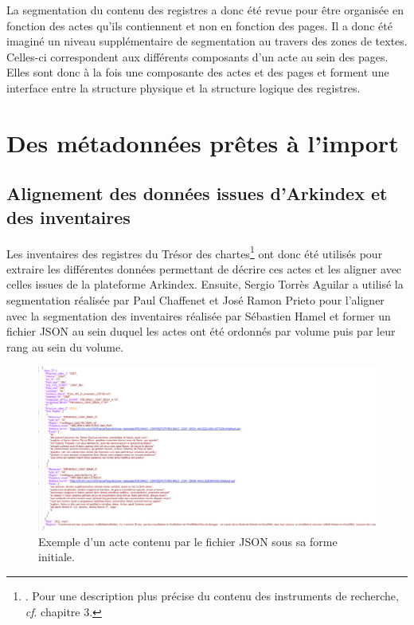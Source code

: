 \documentclass[a4paper,12pt,twoside]{book}
\begin{document}
	La segmentation du contenu des registres a donc été revue pour être organisée en fonction des actes qu'ils contiennent et non en fonction des pages. Il a donc été imaginé un niveau supplémentaire de segmentation au travers des zones de textes. Celles-ci correspondent aux différents composants d'un acte au sein des pages. Elles sont donc à la fois une composante des actes et des pages et forment une interface entre la structure physique et la structure logique des registres.
	
	\section{Des métadonnées prêtes à l’import}
	
	\subsection{Alignement des données issues d'Arkindex et des inventaires}
	
	Les inventaires des registres du Trésor des chartes\footnote{\cite{glenisson_registres_1958}. Pour une description plus précise du contenu des instruments de recherche, \textit{cf}. chapitre 3.} ont donc été utilisés pour extraire les différentes données permettant de décrire ces actes et les aligner avec celles issues de la plateforme Arkindex. Ensuite, Sergio Torrès Aguilar a utilisé la segmentation réalisée par Paul Chaffenet et José Ramon Prieto pour l'aligner avec la segmentation des inventaires réalisée par Sébastien Hamel et former un fichier JSON au sein duquel les actes ont été ordonnés par volume puis par leur rang au sein du volume.
	
	\begin{figure}
		\centering
		\includegraphics[width=\textwidth]{Images/json_zones_textes.png}
		\caption{Exemple d'un acte contenu par le fichier JSON sous sa forme initiale.}
		\label{json_initial}
	\end{figure}
	
\end{document}
